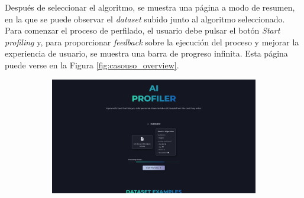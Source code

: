 Después de seleccionar el algoritmo, se muestra una página a modo de resumen, en la que se puede observar el \textit{dataset} subido
junto al algoritmo seleccionado. Para comenzar el proceso de perfilado, el usuario debe pulsar el botón
\textit{Start profiling} y, para proporcionar \textit{feedback} sobre la ejecución del proceso y mejorar la experiencia de usuario,
se muestra una barra de progreso infinita. Esta página puede verse en la Figura \ref{fig:casouso_overview}.

\bigskip
\begin{figure}[H]
	\centering
	\begin{subfigure}[c]{0.74\textwidth}
			\centering
			\includegraphics[width=\textwidth]{imagenes/overview.png}
			\label{fig:casouso_overview_escritorio}
	\end{subfigure}
	\hfill
	\begin{subfigure}[c]{0.21\textwidth}
			\centering

\end{subfigure}
\end{figure}
